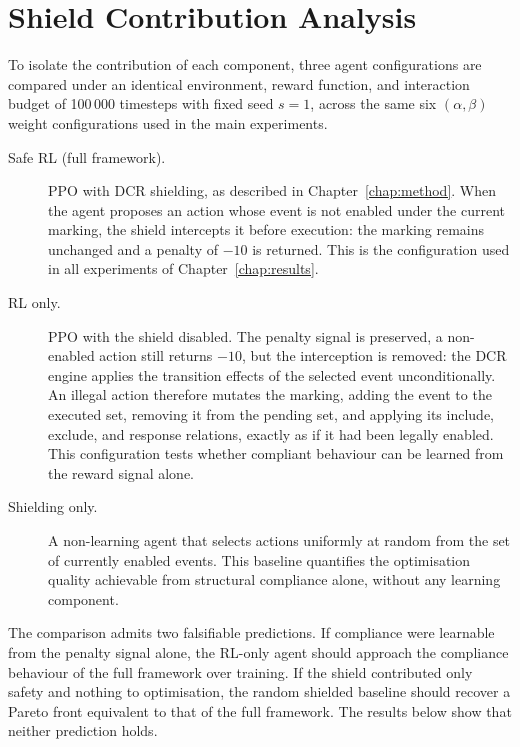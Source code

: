 \section{Shield Contribution Analysis}
\label{sec:shield_contribution}

To isolate the contribution of each component, three agent
configurations are compared under an identical environment, reward
function, and interaction budget of 100\,000 timesteps with fixed seed
$s=1$, across the same six $(\alpha,\beta)$ weight configurations used
in the main experiments.

\begin{description}
    \item[Safe \ac{RL} (full framework).]
    \ac{PPO} with \ac{DCR} shielding, as described in
    Chapter~\ref{chap:method}. When the agent proposes an action whose
    event is not enabled under the current marking, the shield
    intercepts it before execution: the marking remains unchanged and a
    penalty of $-10$ is returned. This is the configuration used in all
    experiments of Chapter~\ref{chap:results}.

    \item[\ac{RL} only.]
    \ac{PPO} with the shield disabled. The penalty signal is preserved,
    a non-enabled action still returns $-10$, but the interception is
    removed: the \ac{DCR} engine applies the transition effects of the
    selected event unconditionally. An illegal action therefore mutates
    the marking, adding the event to the executed set, removing it from
    the pending set, and applying its include, exclude, and response
    relations, exactly as if it had been legally enabled. This
    configuration tests whether compliant behaviour can be learned from
    the reward signal alone.

    \item[Shielding only.]
    A non-learning agent that selects actions uniformly at random from
    the set of currently enabled events. This baseline quantifies the
    optimisation quality achievable from structural compliance alone,
    without any learning component.
\end{description}

The comparison admits two falsifiable predictions. If compliance were
learnable from the penalty signal alone, the \ac{RL}-only agent should
approach the compliance behaviour of the full framework over training.
If the shield contributed only safety and nothing to optimisation, the
random shielded baseline should recover a Pareto front equivalent to
that of the full framework. The results below show that neither
prediction holds.

